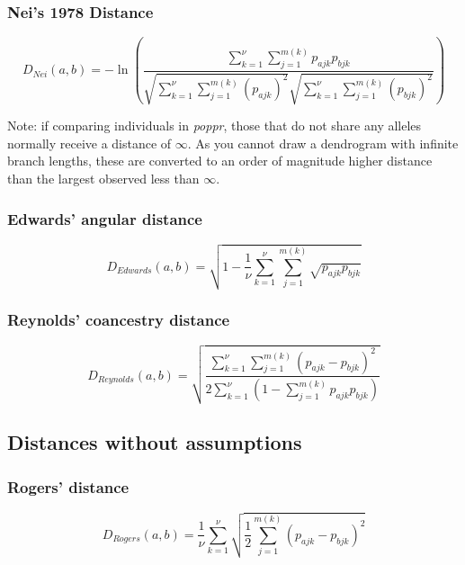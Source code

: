 \documentclass[letterpaper]{article}\usepackage[]{graphicx}\usepackage[]{color}
\newcommand{\poppr}{\textit{poppr}}
\begin{document}
\subsubsection{Nei's 1978 Distance}
\label{distance:nei}
\begin{equation}
  D_{Nei}(a,b)= -\ln\left(\frac{\sum_{k=1}^{\nu} \sum_{j=1}^{m(k)}
  p_{ajk} p_{bjk}}{\sqrt{\sum_{k=1}^{\nu} \sum_{j=1}^{m(k)}
  {(p_{ajk}) }^2}\sqrt{\sum_{k=1}^{\nu} \sum_{j=1}^{m(k)}
  {(p_{bjk})}^2}}\right)
\end{equation}

Note: if comparing individuals in \poppr{}, those that do not share any alleles
normally receive a distance of $\infty$. As you cannot draw a dendrogram with 
infinite branch lengths, these are converted to an order of magnitude higher
distance than the largest observed less than $\infty$.

\subsubsection{Edwards' angular distance}
\label{distance:edwards}
\begin{equation}
  D_{Edwards}(a,b)=\sqrt{1-\frac{1}{\nu} \sum_{k=1}^{\nu}
  \sum_{j=1}^{m(k)} \sqrt{p_{ajk}  p_{bjk}}}
\end{equation}

\subsubsection{Reynolds' coancestry distance}
\label{distance:reynolds}
\begin{equation}
  D_{Reynolds}(a,b)=\sqrt{\frac{\sum_{k=1}^{\nu}
  \sum_{j=1}^{m(k)}{(p_{ajk} - p_{bjk})}^2}{2 \sum_{k=1}^{\nu} \left(1-
  \sum_{j=1}^{m(k)}p_{ajk} p_{bjk}\right)}}
\end{equation}

\subsection{Distances without assumptions}
\subsubsection{Rogers' distance}
\label{distance:rogers}
\begin{equation}
  D_{Rogers}(a,b)=\frac{1}{\nu} \sum_{k=1}^{\nu} \sqrt{\frac{1}{2}
  \sum_{j=1}^{m(k)}{(p_{ajk} - p_{bjk})}^2}
\end{equation}
\end{document}
